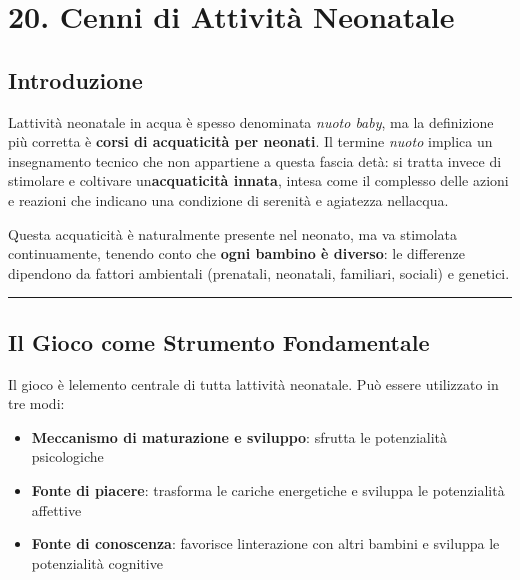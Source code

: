 \documentclass[a4paper,11pt]{article}
\providecommand{\tightlist}{%
  \setlength{\itemsep}{0pt}\setlength{\parskip}{0pt}}
\begin{document}
\section{20. Cenni di Attività
  Neonatale}\label{cenni-di-attivituxe0-neonatale}

\subsection{Introduzione}\label{introduzione-19}

L\textquotesingle attività neonatale in acqua è spesso denominata
\emph{nuoto baby}, ma la definizione più corretta è \textbf{corsi di
      acquaticità per neonati}. Il termine \emph{nuoto} implica un
insegnamento tecnico che non appartiene a questa fascia
d\textquotesingle età: si tratta invece di stimolare e coltivare
un\textquotesingle{}\textbf{acquaticità innata}, intesa come il
complesso delle azioni e reazioni che indicano una condizione di
serenità e agiatezza nell\textquotesingle acqua.

Questa acquaticità è naturalmente presente nel neonato, ma va stimolata
continuamente, tenendo conto che \textbf{ogni bambino è diverso}: le
differenze dipendono da fattori ambientali (prenatali, neonatali,
familiari, sociali) e genetici.

\begin{center}\rule{0.5\linewidth}{0.5pt}\end{center}

\subsection{Il Gioco come Strumento
      Fondamentale}\label{il-gioco-come-strumento-fondamentale}

Il gioco è l\textquotesingle elemento centrale di tutta
l\textquotesingle attività neonatale. Può essere utilizzato in tre modi:

\begin{itemize}
      \tightlist
      \item
            \textbf{Meccanismo di maturazione e sviluppo}: sfrutta le potenzialità
            psicologiche
      \item
            \textbf{Fonte di piacere}: trasforma le cariche energetiche e sviluppa
            le potenzialità affettive
      \item
            \textbf{Fonte di conoscenza}: favorisce l\textquotesingle interazione
            con altri bambini e sviluppa le potenzialità cognitive
\end{itemize}
\end{document}
